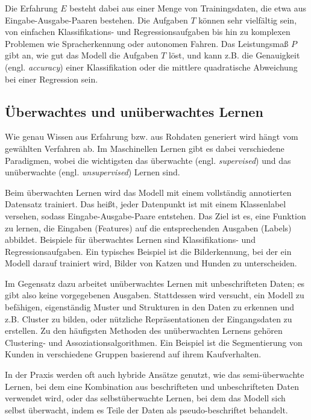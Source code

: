 Die Erfahrung $E$ besteht dabei aus einer Menge von Trainingsdaten, die etwa aus Eingabe-Ausgabe-Paaren bestehen. Die Aufgaben $T$ können sehr vielfältig sein, von einfachen Klassifikations- und Regressionsaufgaben bis hin zu komplexen Problemen wie Spracherkennung oder autonomen Fahren. Das Leistungsmaß $P$ gibt an, wie gut das Modell die Aufgaben $T$ löst, und kann z.B. die Genauigkeit (engl. \textit{accuracy}) einer Klassifikation oder die mittlere quadratische Abweichung bei einer Regression sein.

\subsection{Überwachtes und unüberwachtes Lernen}

Wie genau Wissen aus Erfahrung bzw. aus Rohdaten generiert wird hängt vom gewählten Verfahren ab. Im Maschinellen Lernen gibt es dabei verschiedene Paradigmen, wobei die wichtigsten das überwachte (engl. \textit{supervised}) und das unüberwachte (engl. \textit{unsupervised}) Lernen sind.

Beim überwachten Lernen wird das Modell mit einem vollständig annotierten Datensatz trainiert. Das heißt, jeder Datenpunkt ist mit einem Klassenlabel versehen, sodass Eingabe-Ausgabe-Paare entstehen. Das Ziel ist es, eine Funktion zu lernen, die Eingaben (Features) auf die entsprechenden Ausgaben (Labels) abbildet. Beispiele für überwachtes Lernen sind Klassifikations- und Regressionsaufgaben. Ein typisches Beispiel ist die Bilderkennung, bei der ein Modell darauf trainiert wird, Bilder von Katzen und Hunden zu unterscheiden.

Im Gegensatz dazu arbeitet unüberwachtes Lernen mit unbeschrifteten Daten; es gibt also keine vorgegebenen Ausgaben. Stattdessen wird versucht, ein Modell zu befähigen, eigenständig Muster und Strukturen in den Daten zu erkennen und z.B. Cluster zu bilden, oder nützliche Repräsentationen der Eingangsdaten zu erstellen. Zu den häufigsten Methoden des unüberwachten Lernens gehören Clustering- und Assoziationsalgorithmen. Ein Beispiel ist die Segmentierung von Kunden in verschiedene Gruppen basierend auf ihrem Kaufverhalten. \parencite{}

In der Praxis werden oft auch hybride Ansätze genutzt, wie das semi-überwachte Lernen, bei dem eine Kombination aus beschrifteten und unbeschrifteten Daten verwendet wird, oder das selbstüberwachte Lernen, bei dem das Modell sich selbst überwacht, indem es Teile der Daten als pseudo-beschriftet behandelt.


